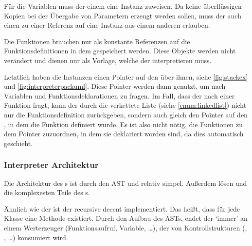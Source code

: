       Für die Variablen muss der  einem  eine  Instanz zuweisen. Da keine überflüssigen Kopien bei der Übergabe von Parametern erzeugt werden sollen, muss der  auch einen  zu einer Referenz auf eine  Instanz aus einem anderen  erlauben.

      Die Funktionen brauchen nur als konstante Referenzen auf die Funktionsdefinitionen in dem  gespeichert werden. Diese Objekte werden nicht verändert und dienen nur als Vorlage, welche der  interpretieren muss.

      Letztlich haben die  Instanzen einen Pointer auf den  über ihnen, siehe \autoref{fig:stackex} und \autoref{fig:interpreterpackuml}. Diese Pointer werden dann genutzt, um nach Variablen und Funktionsdeklarationen zu fragen. Im Fall, dass der  nach einer Funktion fragt, kann der  durch die verkettete Liste (siehe \ref{enum:linkedlist}) nicht nur die Funktionsdefinition zurückgeben, sondern auch gleich den Pointer auf den , in dem die Funktion definiert wurde. Es ist also nicht nötig, die Funktionen zu dem  Pointer zuzuordnen, in dem sie deklariert worden sind, da dies automatisch geschieht.


    \subsubsection{Interpreter Architektur}
    \label{sssec:Interpreter Architektur}
      Die Architektur des s ist durch den AST und  relativ simpel. Außerdem lösen  und  die komplexesten Teile des s.

      Ähnlich wie der  ist der  recursive decent implementiert. Das heißt, dass für jede  Klasse eine  Methode existiert. Durch den Aufbau des ASTs, endet der  `immer' an einem Werterzeuger (Funktionsaufruf, Variable, \ldots), der von Kontrollstrukturen (, , \ldots) konsumiert wird.

